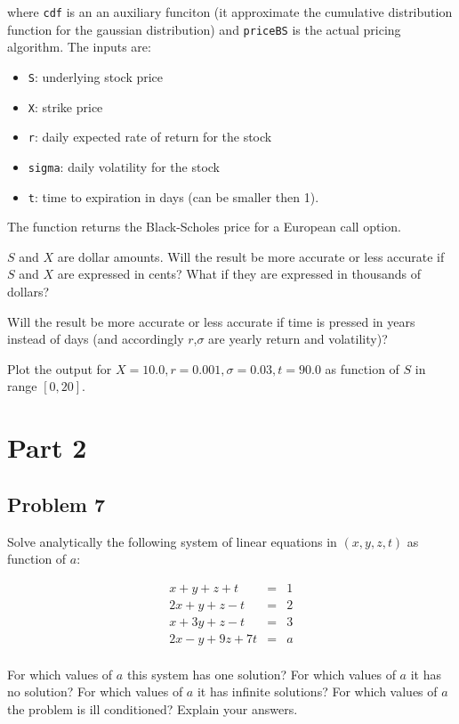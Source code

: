 \documentclass[12pt]{article}
\begin{document}
where {\tt cdf} is an an auxiliary funciton (it approximate the cumulative distribution function for the gaussian distribution) and {\tt priceBS} is the actual pricing algorithm. The inputs are:
\begin{itemize}
\item {\tt S}: underlying stock price 
\item {\tt X}: strike price
\item {\tt r}: daily expected rate of return for the stock
\item {\tt sigma}: daily volatility for the stock
\item {\tt t}: time to expiration in days (can be smaller then 1).
\end{itemize}

The function returns the Black-Scholes price for a European call option.

$S$ and $X$ are dollar amounts. Will the result be more accurate or less accurate if $S$ and $X$ are expressed in cents? What if they are expressed in thousands of dollars?

Will the result be more accurate or less accurate if time is pressed in years instead of days (and accordingly $r$,$\sigma$ are yearly return and volatility)?

Plot the output for $X=10.0,r=0.001,\sigma=0.03,t=90.0$ as function of $S$ in range $[0,20]$.

\section{Part 2}

\subsection{Problem 7}

Solve analytically the following system of linear equations in $(x,y,z,t)$ as function of $a$:

\begin{eqnarray}
 x +  y + z + t &=& 1 \\
2 x + y + z - t &=& 2 \\
x + 3 y + z - t &=& 3 \\
2 x - y + 9 z + 7 t &=& a \\
\end{eqnarray}

For which values of $a$ this system has one solution? For which values of $a$ it has no solution? For which values of $a$ it has infinite solutions? For which values of $a$ the problem is ill conditioned? Explain your answers.
\end{document}

